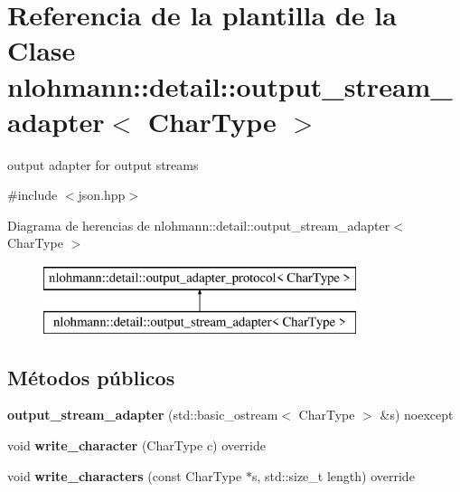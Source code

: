 \hypertarget{classnlohmann_1_1detail_1_1output__stream__adapter}{}\section{Referencia de la plantilla de la Clase nlohmann\+:\+:detail\+:\+:output\+\_\+stream\+\_\+adapter$<$ Char\+Type $>$}
\label{classnlohmann_1_1detail_1_1output__stream__adapter}


output adapter for output streams  




{\ttfamily \#include $<$json.\+hpp$>$}

Diagrama de herencias de nlohmann\+:\+:detail\+:\+:output\+\_\+stream\+\_\+adapter$<$ Char\+Type $>$\begin{figure}[H]
\begin{center}
\leavevmode
\includegraphics[height=2.000000cm]{classnlohmann_1_1detail_1_1output__stream__adapter}
\end{center}
\end{figure}
\subsection*{Métodos públicos}
\begin{DoxyCompactItemize}
\item 
\mbox{\label{classnlohmann_1_1detail_1_1output__stream__adapter_ae44ed343cb1a716248547f48dd045b6a}} 
{\bfseries output\+\_\+stream\+\_\+adapter} (std\+::basic\+\_\+ostream$<$ Char\+Type $>$ \&s) noexcept
\item 
\mbox{\label{classnlohmann_1_1detail_1_1output__stream__adapter_a6e2698c76b200b2d8fac6cebfc43a245}} 
void {\bfseries write\+\_\+character} (Char\+Type c) override
\item 
\mbox{\label{classnlohmann_1_1detail_1_1output__stream__adapter_ad61375497a7d03cb0bdcddfdaad185d0}} 
void {\bfseries write\+\_\+characters} (const Char\+Type $\ast$s, std\+::size\+\_\+t length) override
\end{DoxyCompactItemize}


